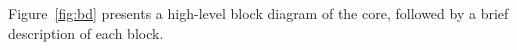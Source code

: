 %

Figure~\ref{fig:bd} presents a high-level block diagram of the core, followed by
a brief description of each block.





